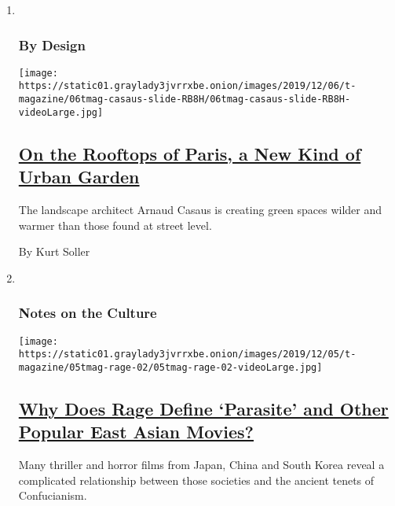 \begin{enumerate}
\def\labelenumi{\arabic{enumi}.}
\item ~
  \hypertarget{by-design}{%
  \subsubsection{By Design}\label{by-design}}

  \texttt{[image: https://static01.graylady3jvrrxbe.onion/images/2019/12/06/t-magazine/06tmag-casaus-slide-RB8H/06tmag-casaus-slide-RB8H-videoLarge.jpg]}

  \hypertarget{on-the-rooftops-of-paris-a-new-kind-of-urban-garden}{%
  \subsection{\texorpdfstring{\href{/2019/12/06/t-magazine/paris-rooftop-garden.html}{On
  the Rooftops of Paris, a New Kind of Urban
  Garden}}{On the Rooftops of Paris, a New Kind of Urban Garden}}\label{on-the-rooftops-of-paris-a-new-kind-of-urban-garden}}

  The landscape architect Arnaud Casaus is creating green spaces wilder
  and warmer than those found at street level.

  By Kurt Soller
\item ~
  \hypertarget{notes-on-the-culture}{%
  \subsubsection{Notes on the Culture}\label{notes-on-the-culture}}

  \texttt{[image: https://static01.graylady3jvrrxbe.onion/images/2019/12/05/t-magazine/05tmag-rage-02/05tmag-rage-02-videoLarge.jpg]}

  \hypertarget{why-does-rage-define-parasite-and-other-popular-east-asian-movies}{%
  \subsection{\texorpdfstring{\href{/2019/11/25/t-magazine/asia-movies-parasite.html}{Why
  Does Rage Define `Parasite' and Other Popular East Asian
  Movies?}}{Why Does Rage Define `Parasite' and Other Popular East Asian Movies?}}\label{why-does-rage-define-parasite-and-other-popular-east-asian-movies}}

  Many thriller and horror films from Japan, China and South Korea
  reveal a complicated relationship between those societies and the
  ancient tenets of Confucianism.


\end{enumerate}
